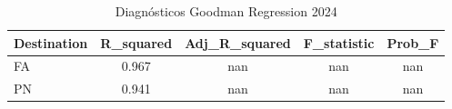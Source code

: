 \begin{table}
\caption{Diagnósticos Goodman Regression 2024}
\label{tab:goodman_diagnostics}
\begin{tabular}{lcccc}
\toprule
Destination & R_squared & Adj_R_squared & F_statistic & Prob_F \\
\midrule
FA & 0.967 & nan & nan & nan \\
PN & 0.941 & nan & nan & nan \\
\bottomrule
\end{tabular}
\end{table}
